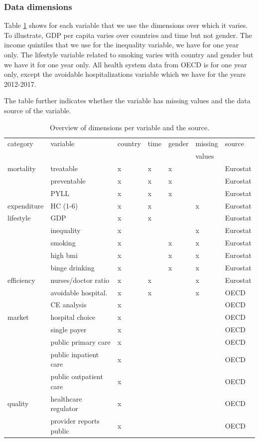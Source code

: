 \documentclass[a4paper,12pt]{article}
\begin{document}
\subsubsection{Data dimensions}
\label{sec:org4a0be8d}
\label{sec:data_dimensions}

Table \ref{tab:data_dimensions} shows for each variable that we use the dimensions over which it varies. To illustrate, GDP per capita varies over countries and time but not gender. The income quintiles that we use for the inequality variable, we have for one year only. The lifestyle variable related to smoking varies with country and gender but we have it for one year only. All health system data from OECD is for one year only, except the avoidable hospitalizations variable which we have for the years 2012-2017.

The table further indicates whether the variable has missing values and the data source of the variable.

\begin{table}[htbp]
\caption{\label{tab:data_dimensions}Overview of dimensions per variable and the source.}
\centering
\begin{tabular}{lllllll}
category & variable & country & time & gender & missing & source\\
 &  &  &  &  & values & \\
\hline
mortality & treatable & x & x & x &  & Eurostat\\
 & preventable & x & x & x &  & Eurostat\\
 & PYLL & x & x & x &  & Eurostat\\
expenditure & HC (1-6) & x & x &  & x & Eurostat\\
lifestyle & GDP & x & x &  &  & Eurostat\\
 & inequality & x &  &  & x & Eurostat\\
 & smoking & x &  & x & x & Eurostat\\
 & high bmi & x &  & x & x & Eurostat\\
 & binge drinking & x &  & x & x & Eurostat\\
efficiency & nurses/doctor ratio & x & x &  & x & Eurostat\\
 & avoidable hospital. & x & x &  & x & OECD\\
 & CE analysis & x &  &  &  & OECD\\
market & hospital choice & x &  &  &  & OECD\\
 & single payer & x &  &  &  & OECD\\
 & public primary care & x &  &  &  & OECD\\
 & public inpatient care & x &  &  &  & OECD\\
 & public outpatient care & x &  &  &  & OECD\\
quality & healthcare regulator & x &  &  &  & OECD\\
 & provider reports public & x &  &  &  & OECD\\
\end{tabular}
\end{table}
\end{document}
